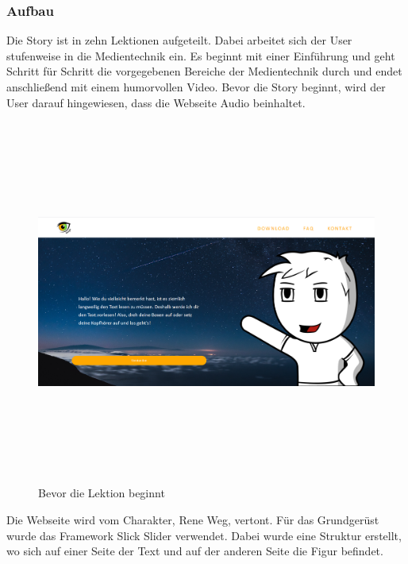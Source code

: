 \subsubsection{Aufbau}
Die Story ist in zehn Lektionen aufgeteilt. Dabei arbeitet sich der User stufenweise in die Medientechnik ein. Es beginnt mit einer Einführung und geht Schritt für Schritt die vorgegebenen Bereiche der Medientechnik durch und endet anschließend mit einem humorvollen Video. Bevor die Story beginnt, wird der User darauf hingewiesen, dass die Webseite Audio beinhaltet. 
\begin{figure}[H]
	\centering				\includegraphics[width=12cm,height=12cm,keepaspectratio]{webseite_abb8} 
	\caption{Bevor die Lektion beginnt}
\end{figure}
Die Webseite wird vom Charakter, Rene Weg, vertont. 
Für das Grundgerüst wurde das Framework Slick Slider verwendet. Dabei wurde eine Struktur erstellt, wo sich auf einer Seite der Text und auf der anderen Seite die Figur befindet. 
